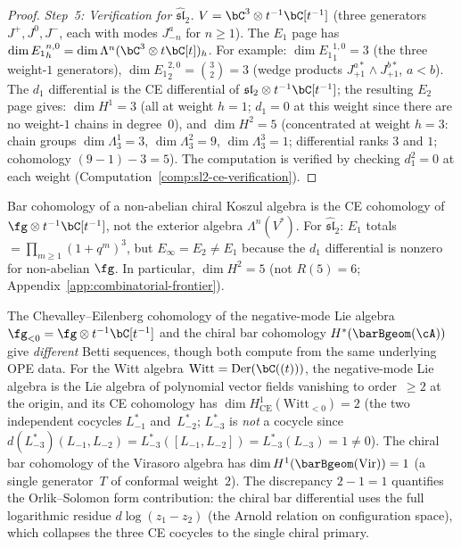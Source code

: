 \begin{proof}
\emph{Step~5: Verification for $\widehat{\mathfrak{sl}}_2$.}
$V = \bC^3 \otimes t^{-1}\bC[t^{-1}]$
(three generators $J^+, J^0, J^-$, each with modes
$J^a_{-n}$ for $n \geq 1$).
The $E_1$ page has
$\dim {E_1}^{n,0}_h = \dim \Lambda^n(\bC^3 \otimes t\bC[t])_h$.
For example: $\dim {E_1}^{1,0}_1 = 3$ (the three weight-$1$
generators), $\dim {E_1}^{2,0}_2 = \binom{3}{2} = 3$
(wedge products $J^{a*}_{+1} \wedge J^{b*}_{+1}$, $a < b$).
The $d_1$ differential is the CE differential of
$\mathfrak{sl}_2 \otimes t^{-1}\bC[t^{-1}]$;
the resulting $E_2$ page gives:
$\dim H^1 = 3$ (all at weight $h = 1$; $d_1 = 0$ at this
weight since there are no weight-$1$ chains in degree~$0$),
and $\dim H^2 = 5$ (concentrated at weight $h = 3$:
chain groups $\dim\Lambda^1_3 = 3$,
$\dim\Lambda^2_3 = 9$,
$\dim\Lambda^3_3 = 1$; differential ranks
$3$ and $1$; cohomology
$(9 - 1) - 3 = 5$).
The computation is verified by checking $d_1^2 = 0$
at each weight (Computation~\ref{comp:sl2-ce-verification}).
\end{proof}

\begin{remark}
\label{rem:ce-vs-exterior}
Bar cohomology of a non-abelian chiral Koszul algebra is the CE cohomology of $\fg \otimes t^{-1}\bC[t^{-1}]$, not the exterior algebra $\Lambda^n(V^*)$. For $\widehat{\mathfrak{sl}}_2$: $E_1$ totals $= \prod_{m \geq 1}(1+q^m)^3$, but $E_\infty = E_2 \neq E_1$ because the $d_1$ differential is nonzero for non-abelian $\fg$. In particular, $\dim H^2 = 5$ (not $R(5) = 6$; Appendix~\ref{app:combinatorial-frontier}).
\end{remark}

\begin{remark}%
\label{rem:ce-vs-chiral-bar}%
%
%
%
%
The Chevalley--Eilenberg cohomology of the negative-mode
Lie algebra $\fg_{<0} = \fg \otimes t^{-1}\bC[t^{-1}]$
and the chiral bar cohomology $H^*(\barBgeom(\cA))$ give
\emph{different} Betti sequences, though both compute from
the same underlying OPE data.
For the Witt algebra $\mathrm{Witt} = \mathrm{Der}(\bC((t)))$,
the negative-mode Lie algebra is the Lie algebra of
polynomial vector fields vanishing to order~$\geq 2$
at the origin, and its CE cohomology has
$\dim H^1_{\mathrm{CE}}(\mathrm{Witt}_{<0}) = 2$
(the two independent cocycles $L_{-1}^*$ and~$L_{-2}^*$;
$L_{-3}^*$ is \emph{not} a cocycle since
$d(L_{-3}^*)(L_{-1}, L_{-2}) = L_{-3}^*([L_{-1}, L_{-2}])
= L_{-3}^*(L_{-3}) = 1 \neq 0$).
The chiral bar cohomology of the Virasoro algebra has
$\dim H^1(\barBgeom(\mathrm{Vir})) = 1$
(a single generator~$T$ of conformal weight~$2$).
The discrepancy $2 - 1 = 1$ quantifies the
Orlik--Solomon form contribution: the chiral bar differential
uses the full logarithmic residue $d\log(z_1 - z_2)$
(the Arnold relation on configuration space),
which collapses the three CE cocycles to the single
chiral primary.
\end{remark}

